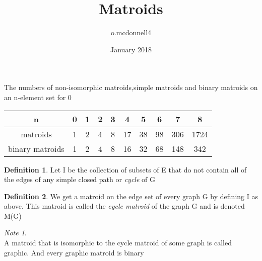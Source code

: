 \documentclass{article}
\title{Matroids}
\author{o.mcdonnell4 }
\date{January 2018}
\theoremstyle{plain}
\theoremstyle{definition}
\newtheorem{defn}{Definition}[section]
\theoremstyle{remark}
\newtheorem*{note}{Note}
\begin{document}
\maketitle

The numbers of non-isomorphic matroids,simple matroids and binary matroids on an n-element set for 0 %

\vspace{20px}

\begin{left}
 \begin{tabular}{||c c c c c c c c c c||} 
 \hline
 n & 0 & 1 & 2 & 3 & 4 & 5 & 6 & 7 & 8 \\ [0.5ex] 
 \hline\hline
 matroids & 1 & 2 & 4 & 8 & 17 & 38 & 98 & 306 & 1724\\ 
 \hline
 binary matroids & 1 & 2 & 4 & 8 & 16 & 32 & 68 & 148 & 342\\
 \hline
 
\end{tabular}
\end{left}

\vspace{20px}

\begin{defn}
    Let I be the collection of subsets of E that do not contain all of the edges of any simple closed path or \textit{cycle} of G
\end{defn}

\begin{defn}
    We get a matroid on the edge set of every graph G by defining I as above. This matroid is called the \textit{cycle matroid} of the graph G and is denoted M(G)
\end{defn}

\begin{note}\\
A matroid that is isomorphic to the cycle matroid of some graph is called graphic.
And every graphic matroid is binary

\end{note}
\end{document}
